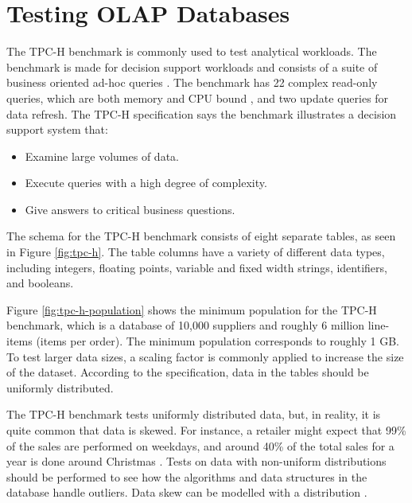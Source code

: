 \section{Testing OLAP Databases}
\label{sec:Testing OLAP Databases}
The TPC-H benchmark is commonly used to test analytical workloads. The benchmark is made for decision support workloads and consists of a suite of business oriented ad-hoc queries \cite{Transaction_Processing_Performance_Council_TPC2014-ux}. The benchmark has 22 complex read-only queries, which are both memory and CPU bound \cite{Boncz2005-wj}, and two update queries for data refresh. The TPC-H specification says the benchmark illustrates a decision support system that:
\begin{itemize}
  \item Examine large volumes of data.
  \item Execute queries with a high degree of complexity.
  \item Give answers to critical business questions.
\end{itemize}

The schema for the TPC-H benchmark consists of eight separate tables, as seen in Figure \ref{fig:tpc-h}. The table columns have a variety of different data types, including integers, floating points, variable and fixed width strings, identifiers, and booleans. 

Figure \ref{fig:tpc-h-population} shows the minimum population for the TPC-H benchmark, which is a database of 10,000 suppliers and roughly 6 million line-items (items per order). The minimum population corresponds to roughly 1 GB. To test larger data sizes, a scaling factor is commonly applied to increase the size of the dataset. According to the specification, data in the tables should be uniformly distributed.

The TPC-H benchmark tests uniformly distributed data, but, in reality, it is quite common that data is skewed. For instance, a retailer might expect that 99\% of the sales are performed on weekdays, and around 40\% of the total sales for a year is done around Christmas \cite{Raman2008-gi}. Tests on data with non-uniform distributions should be performed to see how the algorithms and data structures in the database handle outliers. Data skew can be modelled with a  distribution \cite{Holloway2008-rr}. 


